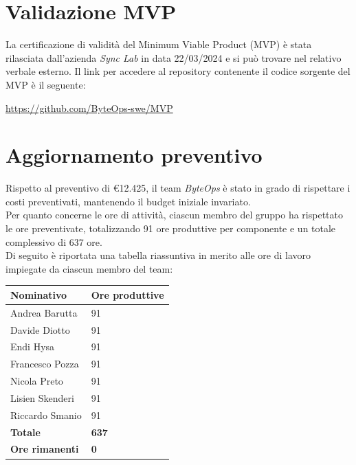 \documentclass{article}
\begin{document}
\section{Validazione MVP}

La certificazione di validità del Minimum Viable Product (MVP) è stata rilasciata dall'azienda \textit{Sync Lab} in data 22/03/2024 e si può trovare nel relativo verbale esterno.
Il link per accedere al repository contenente il codice sorgente del MVP è il seguente: \\
\begin{center}
    \url{https://github.com/ByteOps-swe/MVP}
\end{center}

\section{Aggiornamento preventivo}
Rispetto al preventivo di €12.425, il team \textit{ByteOps} è stato in grado di rispettare i costi preventivati, mantenendo il budget iniziale invariato. \\
Per quanto concerne le ore di attività, ciascun membro del gruppo ha rispettato le ore preventivate, totalizzando 91 ore produttive per componente e un totale complessivo di 637 ore.\\
Di seguito è riportata una tabella riassuntiva in merito alle ore di lavoro impiegate da ciascun membro del team:
\begin{center}
    \begin{tabular}{|C{4cm}|C{2cm}|}
    \hline
        \textbf{Nominativo} & \textbf{Ore produttive} \\
        \hline\hline
        Andrea Barutta  & 91 \\
        \hline
        Davide Diotto   & 91 \\ 
        \hline
        Endi Hysa       & 91 \\ 
        \hline
        Francesco Pozza & 91 \\ 
        \hline
        Nicola Preto    & 91 \\ 
        \hline
        Lisien Skenderi & 91 \\ 
        \hline
        Riccardo Smanio & 91 \\ 
        \hline\hline
        \textbf{Totale} & \textbf{637} \\ 
        \hline
        \textbf{Ore rimanenti} & \textbf{0} \\
        \hline
    \end{tabular}
\end{center}
\end{document}

